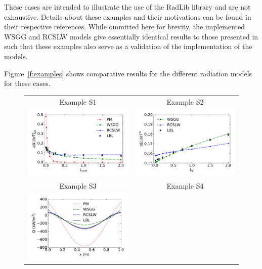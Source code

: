 \documentclass[preprint,12pt, a4paper]{elsarticle}
\begin{document}
These cases are intended to illustrate the use of the RadLib library and are not exhaustive. Details about these examples and their motivations can be found in their respective references. While ommitted here for brevity, the implemented WSGG and RCSLW models give essentially identical results to those presented in \cite{Solovjov_2017,Bordbar_2020} such that these examples also serve as a validation of the implementation of the models.

Figure~\ref{f:examples} shows comparative results for the different radiation models for these cases. 
%
\begin{figure}
    \begin{center}
    \begin{tabular}{c c}
        Example S1 & Example S2 \\
        \includegraphics[width=3 in]{ex_1.pdf} &
        \includegraphics[width=3 in]{ex_2b.pdf} \\
        Example S3 & Example S4 \\
        \includegraphics[width=3 in]{ex_3a.pdf} &

\end{tabular}
\end{center}
\end{figure}
\end{document}
